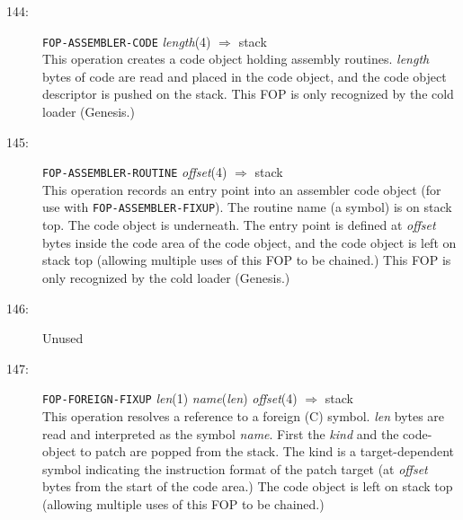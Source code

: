 \begin{description}
\item[144:] \hspace{2em} {\tt FOP-ASSEMBLER-CODE} \hspace{2em} {\it length}(4)
\hspace{2em} $\Rightarrow$ \hspace{2em} stack\\
This operation creates a code object holding assembly routines.  {\it length}
bytes of code are read and placed in the code object, and the code object
descriptor is pushed on the stack.  This FOP is only recognized by the cold
loader (Genesis.)

\item[145:] \hspace{2em} {\tt FOP-ASSEMBLER-ROUTINE} \hspace{2em} {\it offset}(4)
\hspace{2em} $\Rightarrow$ \hspace{2em} stack\\
This operation records an entry point into an assembler code object (for use
with {\tt FOP-ASSEMBLER-FIXUP}).  The routine name (a symbol) is on stack top.
The code object is underneath.  The entry point is defined at {\it offset}
bytes inside the code area of the code object, and the code object is left on
stack top (allowing multiple uses of this FOP to be chained.)  This FOP is only
recognized by the cold loader (Genesis.)

\item[146:] Unused

\item[147:] \hspace{2em} {\tt FOP-FOREIGN-FIXUP} \hspace{2em} {\it len}(1)
\hspace{2em} {\it name}({\it len})
\hspace{2em} {\it offset}(4) \hspace{2em} $\Rightarrow$ \hspace{2em} stack\\
This operation resolves a reference to a foreign (C) symbol.  {\it len} bytes
are read and interpreted as the symbol {\it name}.  First the {\it kind} and the
code-object to patch are popped from the stack.  The kind is a target-dependent
symbol indicating the instruction format of the patch target (at {\it offset}
bytes from the start of the code area.)  The code object is left on
stack top (allowing multiple uses of this FOP to be chained.)


\end{description}
